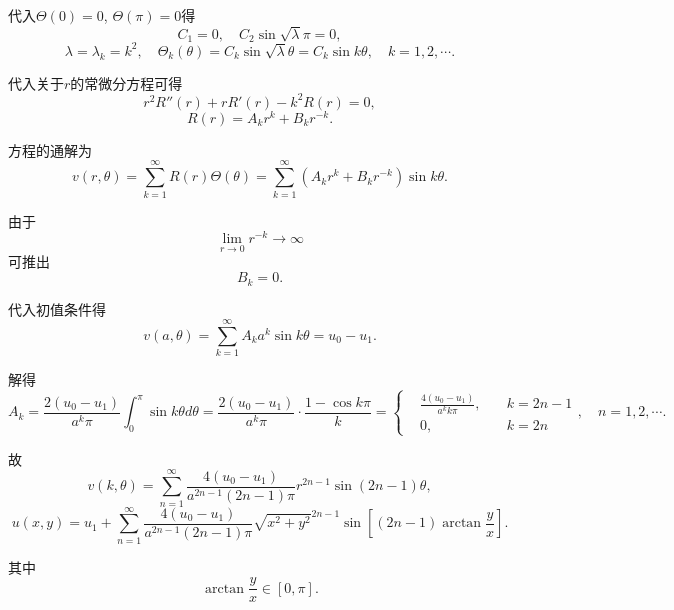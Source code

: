 \documentclass[11pt,a4paper]{article}
\begin{document}
代入$\Theta(0)=0$, $\Theta(\pi)=0$得
$$C_1=0,\quad C_2\sin\sqrt{\lambda}\pi=0,$$
$$\lambda=\lambda_k=k^2,\quad \Theta_k(\theta)=C_k\sin\sqrt{\lambda}\theta=C_k\sin k\theta,\quad k=1,2,\cdots.$$

代入关于$r$的常微分方程可得
$$r^2R''(r)+rR'(r)-k^2R(r)=0,$$
$$R(r)=A_kr^k+B_kr^{-k}.$$

方程的通解为
$$v(r,\theta)=\sum_{k=1}^\infty R(r)\Theta(\theta)=\sum_{k=1}^\infty\left(A_kr^k+B_kr^{-k}\right)\sin k\theta.$$

由于
$$\lim_{r\to0}r^{-k}\to\infty$$
可推出
$$B_k=0.$$

代入初值条件得
$$v(a,\theta)=\sum_{k=1}^\infty A_ka^k\sin k\theta=u_0-u_1.$$

解得
$$A_k=\frac{2(u_0-u_1)}{a^k\pi}\int_0^\pi\sin k\theta d \theta=\frac{2(u_0-u_1)}{a^k\pi}\cdot\frac{1-\cos k\pi}{k}=\left\{\begin{aligned}
     & \frac{4(u_0-u_1)}{a^kk\pi}, & \quad k=2n-1 \\
     & 0,                          & \quad k=2n
  \end{aligned}\right.,\quad n=1,2,\cdots.$$

故
$$v(k,\theta)=\sum_{n=1}^\infty \frac{4(u_0-u_1)}{a^{2n-1}(2n-1)\pi}r^{2n-1}\sin(2n-1)\theta,$$
$$u(x,y)=u_1+\sum_{n=1}^\infty \frac{4(u_0-u_1)}{a^{2n-1}(2n-1)\pi}\sqrt{x^2+y^2}^{2n-1}\sin\left[(2n-1)\arctan\frac{y}{x}\right].$$

其中
$$\arctan\frac{y}{x}\in[0,\pi].$$
\end{document}
